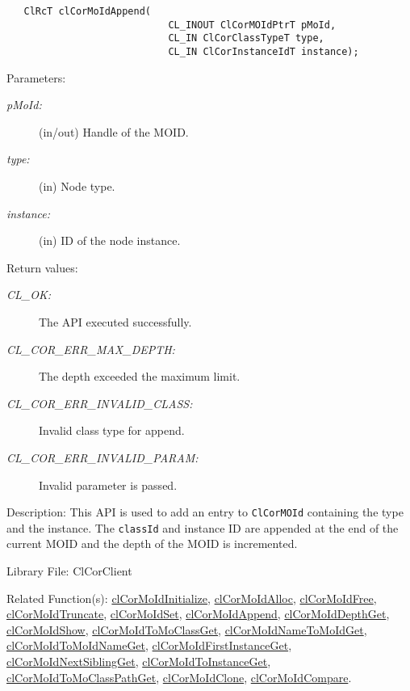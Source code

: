 \begin{flushleft}
\begin{Desc}
\footnotesize\begin{verbatim}   ClRcT clCorMoIdAppend(
              				CL_INOUT ClCorMOIdPtrT pMoId,
              				CL_IN ClCorClassTypeT type,
              				CL_IN ClCorInstanceIdT instance);
\end{verbatim}
\normalsize
\end{Desc}
\begin{Desc}
\item[Parameters:]
\begin{description}
\item[{\em p\-MoId:}](in/out) Handle of the MOID.
\item[{\em type:}](in) Node type. 
\item[{\em instance:}](in) ID of the node instance.\end{description}
\end{Desc}
\begin{Desc}
\item[Return values:]
\begin{description}
\item[{\em CL\_\-OK:}]The API executed successfully. 
\item[{\em CL\_\-COR\_\-ERR\_\-MAX\_\-DEPTH:}]The depth exceeded the maximum limit. 
\item[{\em CL\_\-COR\_\-ERR\_\-INVALID\_\-CLASS:}]Invalid class type for append. 
\item[{\em CL\_\-COR\_\-ERR\_\-INVALID\_\-PARAM:}]Invalid parameter is passed.\end{description}
\end{Desc}
\begin{Desc}
\item[Description:]This API is used to add an entry to {\tt{ClCorMOId}} containing the type and the instance. The 
{\tt{classId}} and instance ID are appended at the end of the current MOID and the depth of the MOID is incremented.\end{Desc}
\begin{Desc}
\item[Library File:]Cl\-Cor\-Client\end{Desc}
\begin{Desc}
\item[Related Function(s):]\hyperlink{pagecor100}{cl\-Cor\-MoId\-Initialize}, \hyperlink{pagecor113}{cl\-Cor\-MoId\-Alloc}, 
\hyperlink{pagecor114}{cl\-Cor\-MoId\-Free},
\hyperlink{pagecor115}{cl\-Cor\-MoId\-Truncate}, 
\hyperlink{pagecor116}{cl\-Cor\-MoId\-Set}, 
\hyperlink{pagecor117}{cl\-Cor\-MoId\-Append}, 
\hyperlink{pagecor118}{cl\-Cor\-MoId\-Depth\-Get}, 
\hyperlink{pagecor119}{cl\-Cor\-MoId\-Show}, 
\hyperlink{pagecor120}{cl\-Cor\-MoId\-To\-Mo\-Class\-Get}, 
\hyperlink{pagecor121}{cl\-Cor\-MoId\-Name\-To\-MoId\-Get}, 
\hyperlink{pagecor122}{cl\-Cor\-MoId\-To\-MoId\-Name\-Get}, 
\hyperlink{pagecor123}{cl\-Cor\-MoId\-First\-Instance\-Get},
\hyperlink{pagecor124}{cl\-Cor\-MoId\-Next\-Sibling\-Get}, 
\hyperlink{pagecor125}{cl\-Cor\-MoId\-To\-Instance\-Get}, 
\hyperlink{pagecor126}{cl\-Cor\-MoId\-To\-Mo\-Class\-Path\-Get}, 
\hyperlink{pagecor127}{cl\-Cor\-MoId\-Clone}, 
\hyperlink{pagecor128}{cl\-Cor\-MoId\-Compare}.\end{Desc}
\newpage



\end{flushleft}

